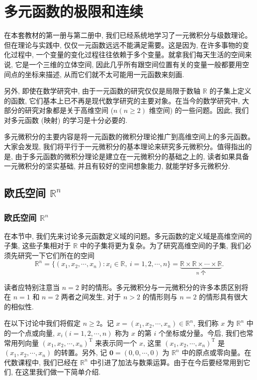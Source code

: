 \setcounter{chapter}{12} %
\chapter{多元函数的极限和连续}
\label{chap:ma-13}

在本套教材的第一册与第二册中, 我们已经系统地学习了一元微积分与级数理论。但在理论与实践中, 仅仅一元函数远远不能满足需要。这是因为, 在许多事物的变化过程中, 一个变量的变化过程往往依赖于多个变量。就拿我们每天生活的空间来说, 它是一个三维的立体空间, 因此几乎所有跟空间位置有关的变量一般都要用空间点的坐标来描述, 从而它们就不太可能用一元函数来刻画.

另外, 即使在数学研究中, 由于一元函数的研究仅仅是局限于数轴 $\mathbb R$ 的子集上定义的函数, 它们基本上已不再是现代数学研究的主要对象。在当今的数学研究中, 大部分的研究对象都是关于高维空间 ($n(n\geqslant2)$ 维空间) 的一些问题。因此, 我们对多元函数 (映射) 的学习是十分必要的.

多元微积分的主要内容是将一元函数的微积分理论推广到高维空间上的多元函数。大家会发现, 我们将平行于一元微积分的基本理论来研究多元微积分。值得指出的是, 由于多元函数的微积分理论是建立在一元微积分的基础之上的, 读者如果具备一元微积分的坚实基础, 并且有较好的空间想象能力, 就能学好多元微积分.

\section{\texorpdfstring{欧氏空间 $\mathbb R^n$}{欧氏空间 Rⁿ}}
\label{sec:ma-13-1}

\subsection{\texorpdfstring{欧氏空间 $\mathbb R^n$}{欧氏空间 Rⁿ}}
\label{subsec:ma-13-1-1}

在本节中, 我们先来讨论多元函数定义域的问题。多元函数的定义域是高维空间的子集, 这些子集相对于 $\mathbb R$ 中的子集将更为复杂。为了研究高维空间的子集, 我们必须先研究一下它们所在的空间
\[
  \mathbb R^n=\{(x_1,x_2,\cdots,x_n):x_i\in\mathbb R,\ i=1,2,\cdots,n\}
  =\underbrace{\mathbb R\times\mathbb R\times\cdots\times\mathbb R}_{n\text{ 个}}.
\]

读者应特别注意当 $n=2$ 时的情形。多元微积分与一元微积分的许多本质区别将在 $n=1$ 和 $n=2$ 两者之间发生, 对于 $n>2$ 的情形则与 $n=2$ 的情形具有很大的相似性.

在以下讨论中我们将假定 $n\geqslant2$。记 $x=(x_1,x_2,\cdots,x_n)\in\mathbb R^n$, 我们称 $x$ 为 $\mathbb R^n$ 中的一个点或向量, $x_i(i=1,2,\cdots,n)$ 称为 $x$ 的第 $i$ 个坐标或分量。今后, 我们也常常用列向量 $(x_1,x_2,\cdots,x_n)^{\mathrm T}$ 来表示同一个 $x$, 这里 $(x_1,x_2,\cdots,x_n)^{\mathrm T}$ 是 $(x_1,x_2,\cdots,x_n)$ 的转置。另外, 记 $\mathbf 0=(0,0,\cdots,0)$ 为 $\mathbb R^n$ 中的原点或零向量。在代数课程中, 我们已经在 $\mathbb R^n$ 中引进了加法与数乘运算。由于在今后要经常用到它们, 在这里我们做一下简单介绍.

